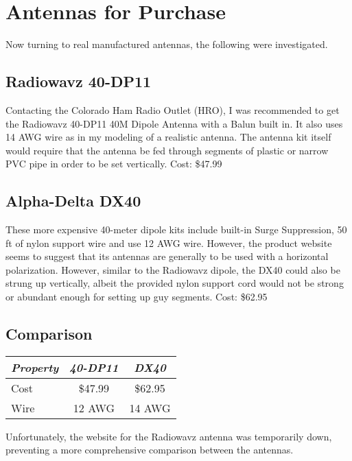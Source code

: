 \section{Antennas for Purchase}

Now turning to real manufactured antennas, the following were investigated.

\subsection{Radiowavz 40-DP11}
  Contacting the Colorado Ham Radio Outlet (HRO), I was recommended to get the
  Radiowavz 40-DP11 40M Dipole Antenna with a Balun built in. It also uses 14
  AWG wire as in my modeling of a realistic antenna. The antenna kit itself
  would require that the antenna be fed through segments of plastic or narrow
  PVC pipe in order to be set vertically.\cite{wavz}
  Cost: \$47.99
\subsection{Alpha-Delta DX40}
  These more expensive 40-meter dipole kits include built-in Surge Suppression,
  50 ft of nylon support wire and use 12 AWG wire. However, the product website
  seems to suggest that its antennas are generally to be used with a horizontal
  polarization. However, similar to the Radiowavz dipole, the DX40 could also
  be strung up vertically, albeit the provided nylon support cord would not be strong or
  abundant enough for setting up guy segments.\cite{dx40}
  Cost: \$62.95
\subsection{Comparison}
\begin{center}
  \begin{tabular}{|l||c|c|}
    \hline
    \emph{Property} & \emph{40-DP11}  & \emph{DX40} \\
    \hline
    Cost            & \$47.99         & \$62.95\\
    Wire            & 12 AWG          & 14 AWG\\
    \hline
  \end{tabular}
\end{center}

Unfortunately, the website for the Radiowavz antenna was temporarily down,
preventing a more comprehensive comparison between the antennas.

